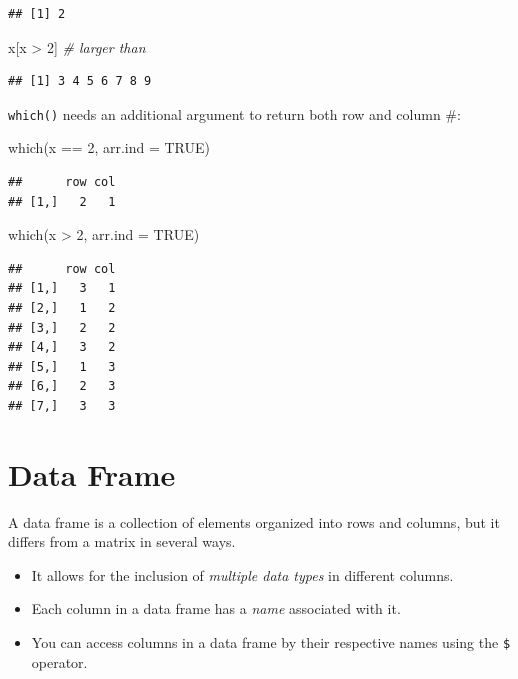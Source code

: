 \documentclass[
]{book}
\newenvironment{Shaded}{\begin{snugshade}}{\end{snugshade}}
\newcommand{\AttributeTok}[1]{\textcolor[rgb]{0.77,0.63,0.00}{#1}}
\newcommand{\CommentTok}[1]{\textcolor[rgb]{0.56,0.35,0.01}{\textit{#1}}}
\newcommand{\ConstantTok}[1]{\textcolor[rgb]{0.00,0.00,0.00}{#1}}
\newcommand{\DecValTok}[1]{\textcolor[rgb]{0.00,0.00,0.81}{#1}}
\newcommand{\FunctionTok}[1]{\textcolor[rgb]{0.00,0.00,0.00}{#1}}
\newcommand{\NormalTok}[1]{#1}
\newcommand{\SpecialCharTok}[1]{\textcolor[rgb]{0.00,0.00,0.00}{#1}}
\providecommand{\tightlist}{%
  \setlength{\itemsep}{0pt}\setlength{\parskip}{0pt}}
\begin{document}
\begin{verbatim}
## [1] 2
\end{verbatim}

\begin{Shaded}
\begin{Highlighting}[]
\NormalTok{x[x }\SpecialCharTok{\textgreater{}} \DecValTok{2}\NormalTok{] }\CommentTok{\# larger than}
\end{Highlighting}
\end{Shaded}

\begin{verbatim}
## [1] 3 4 5 6 7 8 9
\end{verbatim}

\texttt{which()} needs an additional argument to return both row and column \#:

\begin{Shaded}
\begin{Highlighting}[]
\FunctionTok{which}\NormalTok{(x }\SpecialCharTok{==} \DecValTok{2}\NormalTok{, }\AttributeTok{arr.ind =} \ConstantTok{TRUE}\NormalTok{)}
\end{Highlighting}
\end{Shaded}

\begin{verbatim}
##      row col
## [1,]   2   1
\end{verbatim}

\begin{Shaded}
\begin{Highlighting}[]
\FunctionTok{which}\NormalTok{(x }\SpecialCharTok{\textgreater{}} \DecValTok{2}\NormalTok{, }\AttributeTok{arr.ind =} \ConstantTok{TRUE}\NormalTok{)}
\end{Highlighting}
\end{Shaded}

\begin{verbatim}
##      row col
## [1,]   3   1
## [2,]   1   2
## [3,]   2   2
## [4,]   3   2
## [5,]   1   3
## [6,]   2   3
## [7,]   3   3
\end{verbatim}

\hypertarget{data-frame}{%
\section{Data Frame}\label{data-frame}}

A data frame is a collection of elements organized into rows and columns, but it differs from a matrix in several ways.

\begin{itemize}
\tightlist
\item
  It allows for the inclusion of \emph{multiple data types} in different columns.
\item
  Each column in a data frame has a \emph{name} associated with it.
\item
  You can access columns in a data frame by their respective names using the \texttt{\$} operator.
\end{itemize}
\end{document}
